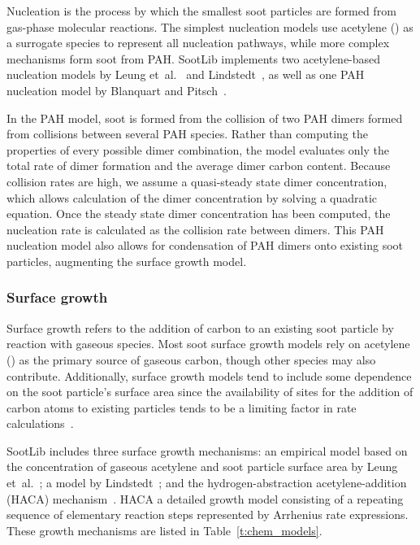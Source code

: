 \documentclass[preprint,letterpaper]{elsarticle}
\begin{document}
Nucleation is the process by which the smallest soot particles are formed from gas-phase molecular reactions.
The simplest nucleation models use acetylene () as a surrogate species to represent all nucleation pathways, while more complex mechanisms form soot from PAH. SootLib implements two acetylene-based nucleation models by Leung et~al.~\cite{Leung_1991} and Lindstedt~\cite{Lindstedt_2005}, as well as one PAH nucleation model by Blanquart and Pitsch~\cite{Blanquart_2009c}.

In the PAH model, soot is formed from the collision of two PAH dimers formed from collisions between several PAH species.
Rather than computing the properties of every possible dimer combination, the model evaluates only the total rate of dimer formation and the average dimer carbon content.
Because collision rates are high, we assume a quasi-steady state dimer concentration, which allows calculation of the dimer concentration by solving a quadratic equation.
Once the steady state dimer concentration has been computed, the nucleation rate is calculated as the collision rate between dimers.
This PAH nucleation model also allows for condensation of PAH dimers onto existing soot particles, augmenting the surface growth model.


\subsubsection{Surface growth}
\label{s:grw}

Surface growth refers to the addition of carbon to an existing soot particle by reaction with gaseous species. Most soot surface growth models rely on acetylene () as the primary source of gaseous carbon, though other species may also contribute. Additionally, surface growth models tend to include some dependence on the soot particle's surface area since the availability of sites for the addition of carbon atoms to existing particles tends to be a limiting factor in rate calculations~\cite{Wang_2011}.

SootLib includes three surface growth mechanisms: an empirical model based on the concentration of gaseous acetylene and soot particle surface area by Leung et~al.~\cite{Leung_1991}; a model by Lindstedt~\cite{Lindstedt_1994}; and the hydrogen-abstraction acetylene-addition (HACA) mechanism~\cite{Appel_2000}. HACA a detailed growth model consisting of a repeating sequence of elementary reaction steps represented by Arrhenius rate expressions. These growth mechanisms are listed in Table~\ref{t:chem_models}.
\end{document}
